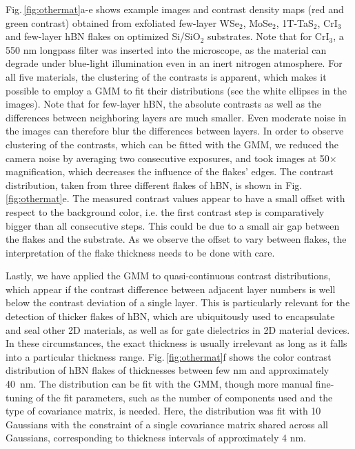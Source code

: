 \documentclass[reprint, prl, superscriptaddress, floatfix]{revtex4-2}
\newcommand{\fig}[1]{Fig.\,\ref{#1}}
\newcommand{\WSe}{WSe$_2$}
\begin{document}
\fig{fig:othermat}a-e shows example images and contrast density maps (red and green contrast) obtained from exfoliated few-layer \WSe, MoSe$_2$, 1T-TaS$_2$, CrI$_3$ and few-layer hBN flakes on optimized Si/SiO$_2$ substrates. 
Note that for CrI$_3$, a 550 nm longpass filter was inserted into the microscope, as the material can degrade under blue-light illumination even in an inert nitrogen atmosphere.
For all five materials, the clustering of the contrasts is apparent, which makes it possible to employ a GMM to fit their distributions (see the white ellipses in the images). 
Note that for few-layer hBN, the absolute contrasts as well as the differences between neighboring layers are much smaller.
Even moderate noise in the images can therefore blur the differences between layers.
In order to observe clustering of the contrasts, which can be fitted with the GMM, we reduced the camera noise by averaging two consecutive exposures, and took images at 50$\times$ magnification, which decreases the influence of the flakes' edges. 
The contrast distribution, taken from three different flakes of hBN, is shown in \fig{fig:othermat}e.
The measured contrast values appear to have a small offset with respect to the background color, i.e. the first contrast step is comparatively bigger than all consecutive steps. 
This could be due to a small air gap between the flakes and the substrate. 
As we observe the offset to vary between flakes, the interpretation of the flake thickness needs to be done with care.  


Lastly, we have applied the GMM to quasi-continuous contrast distributions, which appear if the contrast difference between adjacent layer numbers is well below the contrast deviation of a single layer.  
This is particularly relevant for the detection of thicker flakes of hBN, which are ubiquitously used to encapsulate and seal other 2D materials, as well as for gate dielectrics in 2D material devices.
In these circumstances, the exact thickness is usually irrelevant as long as it falls into a particular thickness range. 
\fig{fig:othermat}f shows the color contrast distribution of hBN flakes of thicknesses between few nm and approximately 40~nm. 
The distribution can be fit with the GMM, though more manual fine-tuning of the fit parameters, such as the number of components used and the type of covariance matrix, is needed.
Here, the distribution was fit with 10 Gaussians with the constraint of a single covariance matrix shared across all Gaussians, corresponding to thickness intervals of approximately 4 nm. 
\end{document}
